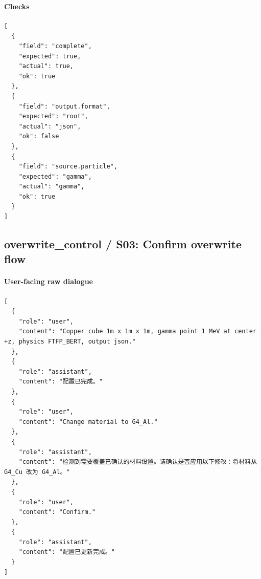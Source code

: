 \documentclass[11pt]{ctexart}
\begin{document}
\paragraph{Checks}
\begin{lstlisting}
[
  {
    "field": "complete",
    "expected": true,
    "actual": true,
    "ok": true
  },
  {
    "field": "output.format",
    "expected": "root",
    "actual": "json",
    "ok": false
  },
  {
    "field": "source.particle",
    "expected": "gamma",
    "actual": "gamma",
    "ok": true
  }
]
\end{lstlisting}
\subsection{overwrite\_control / S03: Confirm overwrite flow}
\paragraph{User-facing raw dialogue}
\begin{lstlisting}
[
  {
    "role": "user",
    "content": "Copper cube 1m x 1m x 1m, gamma point 1 MeV at center +z, physics FTFP_BERT, output json."
  },
  {
    "role": "assistant",
    "content": "配置已完成。"
  },
  {
    "role": "user",
    "content": "Change material to G4_Al."
  },
  {
    "role": "assistant",
    "content": "检测到需要覆盖已确认的材料设置。请确认是否应用以下修改：将材料从 G4_Cu 改为 G4_Al。"
  },
  {
    "role": "user",
    "content": "Confirm."
  },
  {
    "role": "assistant",
    "content": "配置已更新完成。"
  }
]
\end{lstlisting}
\end{document}
